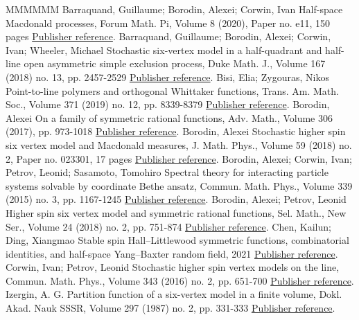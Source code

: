 \documentclass[11pt]{article}
\theoremstyle{definition}
\begin{document}
\begin{thebibliography}{MMMMMM}
 Barraquand, Guillaume; Borodin, Alexei; Corwin, Ivan Half-space Macdonald processes, Forum Math. Pi, Volume 8 (2020), Paper no. e11, 150 pages \href{https://alco.centre-mersenne.org/articles/10.5802/alco.251/#BBC20}{Publisher reference}.
 Barraquand, Guillaume; Borodin, Alexei; Corwin, Ivan; Wheeler, Michael Stochastic six-vertex model in a half-quadrant and half-line open asymmetric simple exclusion process, Duke Math. J., Volume 167 (2018) no. 13, pp. 2457-2529 \href{https://alco.centre-mersenne.org/articles/10.5802/alco.251/#BBCW18}{Publisher reference}.
 Bisi, Elia; Zygouras, Nikos Point-to-line polymers and orthogonal Whittaker functions, Trans. Am. Math. Soc., Volume 371 (2019) no. 12, pp. 8339-8379 \href{https://alco.centre-mersenne.org/articles/10.5802/alco.251/#BZ19}{Publisher reference}.
 Borodin, Alexei On a family of symmetric rational functions, Adv. Math., Volume 306 (2017), pp. 973-1018 \href{https://alco.centre-mersenne.org/articles/10.5802/alco.251/#Bor17}{Publisher reference}.
 Borodin, Alexei Stochastic higher spin six vertex model and Macdonald measures, J. Math. Phys., Volume 59 (2018) no. 2, Paper no. 023301, 17 pages \href{https://alco.centre-mersenne.org/articles/10.5802/alco.251/#Bor18}{Publisher reference}.
 Borodin, Alexei; Corwin, Ivan; Petrov, Leonid; Sasamoto, Tomohiro Spectral theory for interacting particle systems solvable by coordinate Bethe ansatz, Commun. Math. Phys., Volume 339 (2015) no. 3, pp. 1167-1245 \href{https://alco.centre-mersenne.org/articles/10.5802/alco.251/#BCPS15}{Publisher reference}.
 Borodin, Alexei; Petrov, Leonid Higher spin six vertex model and symmetric rational functions, Sel. Math., New Ser., Volume 24 (2018) no. 2, pp. 751-874 \href{https://alco.centre-mersenne.org/articles/10.5802/alco.251/#BP18}{Publisher reference}.
 Chen, Kailun; Ding, Xiangmao Stable spin Hall–Littlewood symmetric functions, combinatorial identities, and half-space Yang–Baxter random field, 2021 \href{https://alco.centre-mersenne.org/articles/10.5802/alco.251/#CD21}{Publisher reference}.
 Corwin, Ivan; Petrov, Leonid Stochastic higher spin vertex models on the line, Commun. Math. Phys., Volume 343 (2016) no. 2, pp. 651-700 \href{https://alco.centre-mersenne.org/articles/10.5802/alco.251/#CP16}{Publisher reference}.
 Izergin, A. G. Partition function of a six-vertex model in a finite volume, Dokl. Akad. Nauk SSSR, Volume 297 (1987) no. 2, pp. 331-333 \href{https://alco.centre-mersenne.org/articles/10.5802/alco.251/#Ize87}{Publisher reference}.

\end{thebibliography}
\end{document}

